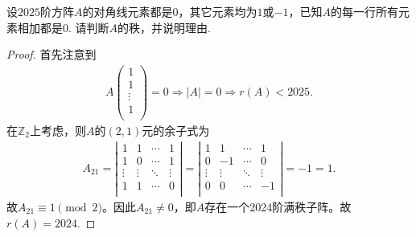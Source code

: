 \documentclass[../../main.tex]{subfiles}
\begin{document}
\begin{example}
设$2025$阶方阵$A$的对角线元素都是$0$，其它元素均为$1$或$-1$，已知$A$的每一行所有元素相加都是$0$. 请判断$A$的秩，并说明理由.
\end{example}
\begin{proof}
首先注意到
\begin{align*}
A\left( \begin{array}{c}
1\\
1\\
\vdots\\
1\\
\end{array} \right) =0\Longrightarrow \left| A \right|=0\Longrightarrow r\left( A \right) <2025.
\end{align*}
在$\mathbb{Z}_2$上考虑，则$A$的$(2,1)$元的余子式为
\begin{align*}
A_{21}=\left| \begin{matrix}
1&		1&		\cdots&		1\\
1&		0&		\cdots&		1\\
\vdots&		\vdots&		\ddots&		\vdots\\
1&		1&		\cdots&		0\\
\end{matrix} \right|=\left| \begin{matrix}
1&		1&		\cdots&		1\\
0&		-1&		\cdots&		0\\
\vdots&		\vdots&		\ddots&		\vdots\\
0&		0&		\cdots&		-1\\
\end{matrix} \right|=-1=1.
\end{align*}
故$A_{21}\equiv 1 \pmod{2}$。因此$A_{21}\ne 0$，即$A$存在一个2024阶满秩子阵。故$r\left( A \right) =2024$.

\end{proof}
\end{document}
